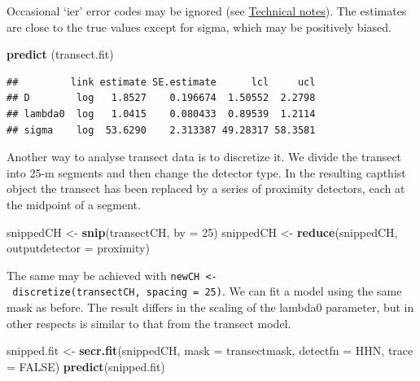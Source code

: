 \documentclass[
]{book}
\newenvironment{Shaded}{\begin{snugshade}}{\end{snugshade}}
\newcommand{\AttributeTok}[1]{\textcolor[rgb]{0.13,0.29,0.53}{#1}}
\newcommand{\ConstantTok}[1]{\textcolor[rgb]{0.56,0.35,0.01}{#1}}
\newcommand{\DecValTok}[1]{\textcolor[rgb]{0.00,0.00,0.81}{#1}}
\newcommand{\FunctionTok}[1]{\textcolor[rgb]{0.13,0.29,0.53}{\textbf{#1}}}
\newcommand{\NormalTok}[1]{#1}
\newcommand{\OtherTok}[1]{\textcolor[rgb]{0.56,0.35,0.01}{#1}}
\newcommand{\StringTok}[1]{\textcolor[rgb]{0.31,0.60,0.02}{#1}}
\begin{document}
Occasional `ier' error codes may be ignored (see \hyperref[technotes]{Technical notes}). The estimates are close to the true values except for sigma, which may be positively biased.

\begin{Shaded}
\begin{Highlighting}[]
\FunctionTok{predict}\NormalTok{ (transect.fit)}
\end{Highlighting}
\end{Shaded}

\begin{verbatim}
##         link estimate SE.estimate      lcl     ucl
## D        log   1.8527    0.196674  1.50552  2.2798
## lambda0  log   1.0415    0.080433  0.89539  1.2114
## sigma    log  53.6290    2.313387 49.28317 58.3581
\end{verbatim}

Another way to analyse transect data is to discretize it. We divide the transect into 25-m segments and then change the detector type. In the resulting capthist object the transect has been replaced by a series of proximity detectors, each at the midpoint of a segment.

\begin{Shaded}
\begin{Highlighting}[]
\NormalTok{snippedCH }\OtherTok{\textless{}{-}} \FunctionTok{snip}\NormalTok{(transectCH, }\AttributeTok{by =} \DecValTok{25}\NormalTok{)}
\NormalTok{snippedCH }\OtherTok{\textless{}{-}} \FunctionTok{reduce}\NormalTok{(snippedCH, }\AttributeTok{outputdetector =} \StringTok{\textquotesingle{}proximity\textquotesingle{}}\NormalTok{)}
\end{Highlighting}
\end{Shaded}

The same may be achieved with \texttt{newCH\ \textless{}-\ discretize(transectCH,\ spacing\ =\ 25)}. We can fit a model using the same mask as before. The result differs in the scaling of the lambda0 parameter, but in other respects is similar to that from the transect model.

\begin{Shaded}
\begin{Highlighting}[]
\NormalTok{snipped.fit }\OtherTok{\textless{}{-}} \FunctionTok{secr.fit}\NormalTok{(snippedCH, }\AttributeTok{mask =}\NormalTok{ transectmask, }
    \AttributeTok{detectfn =} \StringTok{\textquotesingle{}HHN\textquotesingle{}}\NormalTok{, }\AttributeTok{trace =} \ConstantTok{FALSE}\NormalTok{)}
\FunctionTok{predict}\NormalTok{(snipped.fit)}
\end{Highlighting}
\end{Shaded}
\end{document}
